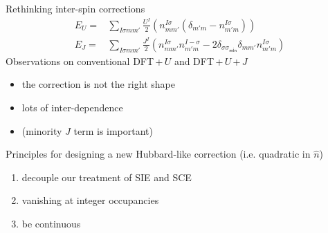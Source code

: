 \documentclass[xcolor=table,aspectratio=169]{beamer}
\numberwithin{equation}{section}
\begin{document}
% 
% 
% 
\begin{frame}{Rethinking inter-spin corrections}
    \begin{align*}
        E_{U} = & \sum_{I\sigma m m'} \frac{U^I}{2} \left(n^{I\sigma}_{mm'} (\delta_{m'm} - n^{I\sigma}_{m'm})\right)                                                       \\
        E_{J} = & \sum_{I\sigma m m'} \frac{J^I}{2} \left( n^{I\sigma}_{mm'} n^{I-\sigma}_{m'm} - 2\delta_{\sigma \sigma_\mathsf{min}}\delta_{mm'} n^{I\sigma}_{m'm}\right)
        \label{eqn:j_correction}
    \end{align*}
    Observations on conventional DFT\,+\,$U$ and DFT\,+\,$U$\,+\,$J$
    \begin{itemize}
        \item the correction is not the right shape
        \item lots of inter-dependence
        \item (minority $J$ term is important)
    \end{itemize}

    Principles for designing a new Hubbard-like correction (i.e. quadratic in $\hat n$)
    \begin{enumerate}
        \item decouple our treatment of SIE and SCE
        \item vanishing at integer occupancies
        \item be continuous
    \end{enumerate}
\end{frame}
\end{document}
